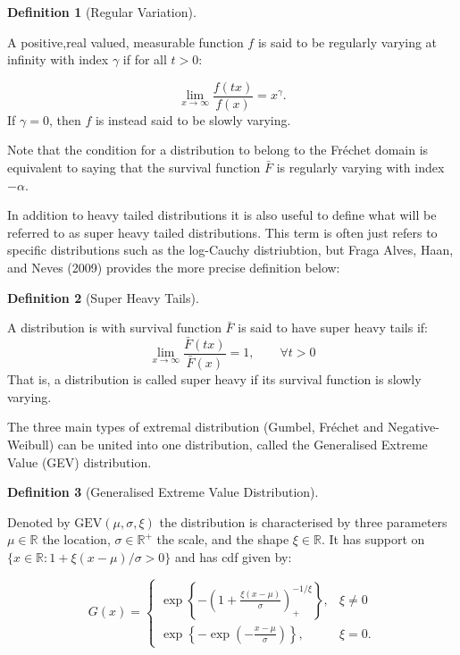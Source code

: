 \documentclass[
  10pt,
  a4paper,
]{scrreprt}
\theoremstyle{definition}
\newtheorem{definition}{Definition}[section]
\theoremstyle{plain}
\theoremstyle{remark}
\begin{document}
{\begin{definition}[Regular
Variation]\protect\hypertarget{def-rv}{}\label{def-rv}

A positive,real valued, measurable function \(f\) is said to be
regularly varying at infinity with index \(\gamma\) if for all \(t>0\):

\[
\lim_{x\rightarrow\infty}\displaystyle\frac{f(tx)}{f(x)} = x^{\gamma}.
\] If \(\gamma =0\), then \(f\) is instead said to be slowly varying.

\end{definition}

Note that the condition for a distribution to belong to the Fréchet
domain is equivalent to saying that the survival function \(\bar F\) is
regularly varying with index \(-\alpha\).

In addition to heavy tailed distributions it is also useful to define
what will be referred to as super heavy tailed distributions. This term
is often just refers to specific distributions such as the log-Cauchy
distriubtion, but Fraga Alves, Haan, and Neves (2009) provides the more
precise definition below:

\begin{definition}[Super Heavy
Tails]\protect\hypertarget{def-sup}{}\label{def-sup}

A distribution is with survival function \(\bar F\) is said to have
super heavy tails if: \[
\lim_{x\rightarrow\infty}\displaystyle\frac{\bar F(tx)}{\bar F (x)} = 1,\qquad \forall t>0
\] That is, a distribution is called super heavy if its survival
function is slowly varying.

\end{definition}

The three main types of extremal distribution (Gumbel, Fréchet and
Negative-Weibull) can be united into one distribution, called the
Generalised Extreme Value (GEV) distribution.

\begin{definition}[Generalised Extreme Value
Distribution]\protect\hypertarget{def-gev}{}\label{def-gev}

Denoted by \(\text{GEV}(\mu,\sigma,\xi)\) the distribution is
characterised by three parameters \(\mu \in \mathbb R\) the location,
\(\sigma\in \mathbb R^+\) the scale, and the shape \(\xi\in \mathbb R\).
It has support on \(\{x\in \mathbb R:1+\xi(x-\mu)/\sigma > 0\}\) and has
cdf given by:

\[
G(x) = \begin{cases}\exp\left\{-\left(1+\displaystyle\frac{\xi(x-\mu)}{\sigma}\right)_+^{-1/\xi}\right\},&\xi\ne0\\
\exp\left\{-\exp\left(-\displaystyle\frac{x-\mu}{\sigma}\right)\right\},&\xi=0.
\end{cases}
\]


\end{definition}}
\end{document}

